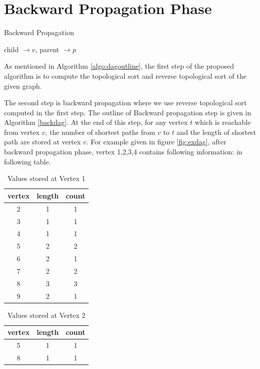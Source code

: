 \section{Backward Propagation Phase}
\begin{algorithm}
\caption{Backward Propagation}
\label{backdag}
child $\rightarrow v$, parent $\rightarrow p$ \\

\end{algorithm}
As mentioned in Algorithm \ref{algo:dagoutline}, the first step of the proposed algorithm is to compute the topological sort and reverse topological sort of the given graph.

The second step is backward propagation where we use reverse topological sort computed in the first step. The outline of Backward propagation step is given in Algorithm \ref{backdag}. At the end of this step, for any vertex $t$ which is reachable from vertex $v$, the number of shortest paths from $v$ to $t$ and the length of shortest path are stored at vertex $v$. 
For example given in figure \ref{fig:exdag}, after backward propagation phase, vertex 1,2,3,4 contains following information: in following table.


\begin{table}[h!]
\centering
\begin{tabular}{|c|c|c|}
\hline
vertex & length & count \\
\hline
2 & 1 & 1 \\ 
\hline
3 & 1 & 1 \\ 
\hline
4 & 1 & 1 \\ 
\hline
5 & 2 & 2 \\ 
\hline
6 & 2 & 1 \\ 
\hline
7 & 2 & 2 \\ 
\hline
8 & 3 & 3 \\ 
\hline
9 & 2 & 1 \\ 
\hline
\end{tabular}
\caption{Values stored at Vertex 1}
\label{tab:data1}
\end{table}

    \begin{table}[h!]
    \centering
        \begin{tabular}{|c|c|c|}
            \hline
            vertex & length & count \\
            \hline
            5 & 1 & 1 \\ 
            \hline
            8 & 1 & 1 \\ 
            \hline
        \end{tabular}
    \caption{Values stored at Vertex 2}
    \label{tab:data2}
    \end{table}


